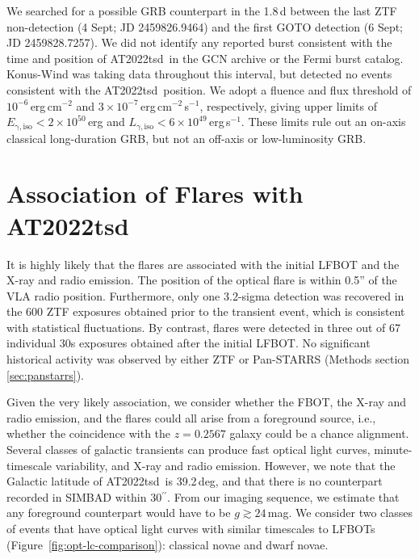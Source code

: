 \documentclass{nature_plusfigure}
\newcommand{\at}{AT2022tsd}
\begin{document}
\begin{methods}
We searched for a possible GRB counterpart in the 1.8\,d between the last ZTF non-detection (4 Sept; JD 2459826.9464) and the first GOTO detection (6 Sept; JD 2459828.7257). We did not identify any reported burst consistent with the time and position of \at\ in the GCN archive or the Fermi burst catalog. Konus-Wind was taking data throughout this interval, but detected no events consistent with the \at\ position. We adopt a  fluence and flux threshold of $10^{-6}\,$erg\,cm$^{-2}$ and $3\times10^{-7}\,$erg\,cm$^{-2}$\,s$^{-1}$, respectively\cite{Tsvetkova2017},
giving upper limits of $E_\mathrm{\gamma,iso}<2\times10^{50}\,$erg and $L_{\gamma,\mathrm{iso}}<6\times10^{49}\,$erg\,s$^{-1}$.
These limits rule out an on-axis classical long-duration GRB, but not an off-axis or low-luminosity GRB\cite{Cano2017}.

\section{Association of Flares with \at}
\label{sec:flare-association}

It is highly likely that the flares are associated with the initial LFBOT and the X-ray and radio emission. The position of the optical flare is within 0.5'' of the VLA radio position. Furthermore, only one 3.2-sigma detection was recovered in the 600 ZTF exposures obtained prior to the transient event, which is consistent with statistical fluctuations. By contrast, flares were detected in three out of 67 individual 30s exposures obtained after the initial LFBOT. No significant historical activity was observed by either ZTF or Pan-STARRS\cite{Fulton2022} (Methods section \ref{sec:panstarrs}). 

Given the very likely association, we consider whether the FBOT, the X-ray and radio emission, and the flares could all arise from a foreground source, i.e., whether the coincidence with the $z=0.2567$ galaxy could be a chance alignment. 
Several classes of galactic transients can produce fast optical light curves, minute-timescale variability, and X-ray and radio emission. However, we note that the Galactic latitude of \at\ is 39.2\,deg, and that there is no counterpart recorded in SIMBAD within 30$^{\prime\prime}$. From our imaging sequence, we estimate that any foreground counterpart would have to be $g \gtrsim 24\,$mag. We consider two classes of events that have optical light curves with similar timescales to LFBOTs (Figure~\ref{fig:opt-lc-comparison}): classical novae and dwarf novae.


\end{methods}
\end{document}
